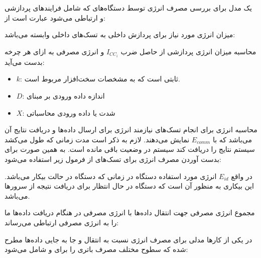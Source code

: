 یک مدل برای بررسی مصرف انرژی توسط دستگاه‌های  که شامل فرایند‌های پردازشی
و ارتباطی می‌شود عبارت است از:


میزان انرژی مورد نیاز برای پردازش داخلی به تسک‌های داخلی وابسته می‌باشد:


محاسبه میزان انرژی پردازشی از حاصل ضرب $I_{CC_i}$ و انرژی مصرفی  به ازای
هر چرخه  بدست می‌آید:


\begin{itemize}
    \item $k$: ثابتی است که به مشخصات سخت‌افزار مربوط است.
    \item $D$: اندازه داده ورودی بر مبنای 
    \item $X$: شدت یا داده ورودی محاسباتی
\end{itemize}

محاسبه انرژی برای انجام تسک‌های  نیازمند انرژی برای ارسال داده‌ها
و دریافت نتایج آن می‌باشد که با $E_{comm}$ نمایش می‌دهند. لازم به ذکر است مدت
زمانی که طول می‌کشد سیستم نتایج را دریافت کند سیستم در وضعیت  باقی
مانده است. به همین صورت برای بدست آوردن مصرف انرژی برای تسک‌های 
از فرمول زیر استفاده می‌شود:


در واقع $E_{id}$ انرژی مورد استفاده دستگاه  در زمانی که دستگاه در حالت
بیکار می‌باشد. این بیکاری به منظور آن است که دستگاه  در حال انتظار برای
دریافت نتیجه از سرور‌ها می‌باشد.


مجموع انرژی مصرفی جهت انتقال داده‌ها با انرژی مصرفی در هنگام دریافت داده‌ها ما
را به انرژی مصرفی ارتباطی می‌رساند:


در یکی از کار‌ها \cite{huang2012close} مدلی برای مصرف انرژی نسبت به انتقال و جا
به جایی داده‌ها مطرح شده که سطوح مختلف مصرف باتری را برای  و
 شامل می‌شود:


